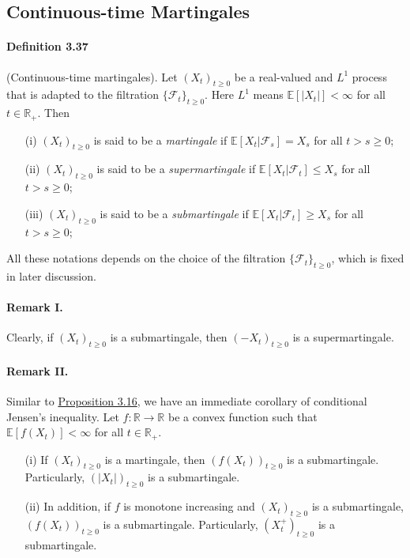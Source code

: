 \documentclass{article}
\numberwithin{equation}{section}
\newcommand{\E}{\mathbb{E}}
\theoremstyle{plain}
\theoremstyle{definition}
\begin{document}
\newpage
\subsection{Continuous-time Martingales}
\paragraph{Definition 3.37\label{def:3.37}} (Continuous-time martingales). Let $(X_t)_{t\geq 0}$ be a real-valued and $L^1$ process that is adapted to the filtration $\{\mathscr{F}_t\}_{t\geq 0}$. Here $L^1$ means $\E[\vert X_t\vert]<\infty$ for all $t\in\mathbb{R}_+$. Then
\begin{itemize} 
	\item[(i)] $(X_t)_{t\geq 0}$ is said to be a \textit{martingale} if $\E[X_t|\mathscr{F}_s]=X_s$ for all $t>s\geq 0$;
	\item[(ii)] $(X_t)_{t\geq 0}$ is said to be a \textit{supermartingale} if $\E[X_t|\mathscr{F}_t]\leq X_s$ for all $t>s\geq 0$;
	\item[(iii)] $(X_t)_{t\geq 0}$ is said to be a \textit{submartingale} if $\E[X_t|\mathscr{F}_t]\geq X_s$ for all $t>s\geq 0$;
\end{itemize}
All these notations depends on the choice of the filtration $\{\mathscr{F}_t\}_{t\geq 0}$, which is fixed in later discussion.

\paragraph{Remark I.} Clearly, if $(X_t)_{t\geq 0}$ is a submartingale, then $(-X_t)_{t\geq 0}$ is a supermartingale.

\paragraph{Remark II.} Similar to \hyperref[prop:3.16]{Proposition 3.16}, we have an immediate corollary of conditional Jensen's inequality. Let $f:\mathbb{R}\to\mathbb{R}$ be a convex function such that $\E[f(X_t)]<\infty$ for all $t\in\mathbb{R}_+$.
\begin{itemize}
	\item[(i)] If $(X_t)_{t\geq 0}$ is a martingale, then $(f(X_t))_{t\geq 0}$ is a submartingale. Particularly, $(\vert X_t\vert)_{t\geq 0}$ is a submartingale.
	\item[(ii)] In addition, if $f$ is monotone increasing and $(X_t)_{t\geq 0}$ is a submartingale, $(f(X_t))_{t\geq 0}$ is a submartingale. Particularly, $(X_t^+)_{t\geq 0}$ is a submartingale.
\end{itemize}
\end{document}
